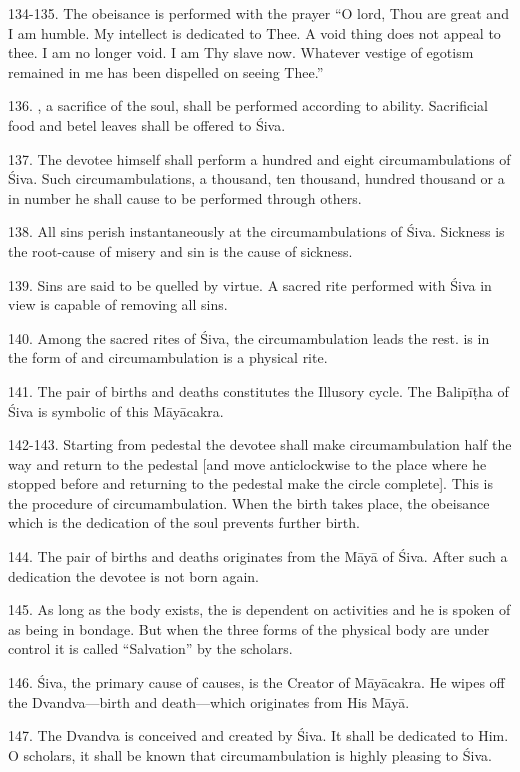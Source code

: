 134-135. The obeisance is performed with the prayer “O lord, Thou are great and
I am humble. My intellect is dedicated to Thee. A void thing does not appeal to
thee. I am no longer void. I am Thy slave now. Whatever vestige of egotism
remained in me has been dispelled on seeing Thee.”

136. , a sacrifice of the soul, shall be performed according to
ability. Sacrificial food and betel leaves shall be offered to Śiva.

137. The devotee himself shall perform a hundred and eight circumambulations of
Śiva. Such circumambulations, a thousand, ten thousand, hundred thousand or a
 in number he shall cause to be performed through others.

138. All sins perish instantaneously at the circumambulations of Śiva. Sickness
is the root-cause of misery and sin is the cause of sickness.

139. Sins are said to be quelled by virtue. A sacred rite performed with Śiva in
view is capable of removing all sins.

140. Among the sacred rites of Śiva, the circumambulation leads the rest.
 is in the form of  and circumambulation is a physical rite.

141. The pair of births and deaths constitutes the Illusory cycle. The Balipīṭha
of Śiva is symbolic of this Māyācakra.

142-143. Starting from pedestal the devotee shall make circumambulation half
the way and return to the pedestal [and move anticlockwise to the place where he
stopped before and returning to the pedestal make the circle complete]. This is
the procedure of circumambulation. When the birth takes place, the obeisance
which is the dedication of the soul prevents further birth.

144. The pair of births and deaths originates from the Māyā of Śiva. After such
a dedication the devotee is not born again.

145. As long as the body exists, the  is dependent on activities and he
is spoken of as being in bondage. But when the three forms of the physical body
are under control it is called “Salvation” by the scholars.

146. Śiva, the primary cause of causes, is the Creator of Māyācakra. He wipes
off the Dvandva—birth and death—which originates from His Māyā.

147. The Dvandva is conceived and created by Śiva. It shall be dedicated to Him.
O scholars, it shall be known that circumambulation is highly pleasing to Śiva.

